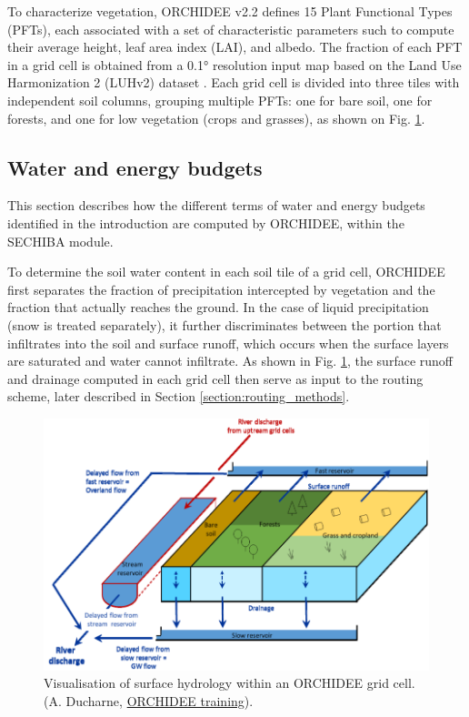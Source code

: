 To characterize vegetation, ORCHIDEE v2.2 defines 15 Plant Functional Types (PFTs), each associated with a set of characteristic parameters such to compute their average height, leaf area index (LAI), and albedo. The fraction of each PFT in a grid cell is obtained from a 0.1° resolution input map based on the Land Use Harmonization 2 (LUHv2) dataset \citep{hurtt_harmonization_2020, lurton_implementation_2020}. 
Each grid cell is divided into three tiles with independent soil columns, grouping multiple PFTs: one for bare soil, one for forests, and one for low vegetation (crops and grasses), as shown on Fig. \ref{fig:water_balance_AD}. 

\subsection{Water and energy budgets}

This section describes how the different terms of water and energy budgets identified in the introduction are computed by ORCHIDEE, within the SECHIBA module. 

To determine the soil water content in each soil tile of a grid cell, ORCHIDEE first separates the fraction of precipitation intercepted by vegetation and the fraction that actually reaches the ground. In the case of liquid precipitation (snow is treated separately), it further discriminates between the portion that infiltrates into the soil and surface runoff, which occurs when the surface layers are saturated and water cannot infiltrate. As shown in Fig. \ref{fig:water_balance_AD}, the surface runoff and drainage computed in each grid cell then serve as input to the routing scheme, later described in Section \ref{section:routing_methods}.

\begin{figure}[hbtp]
    \centering
    \includegraphics[width=0.8\linewidth]{images/methods/water_balance_AD.png}
    \caption{Visualisation of surface hydrology within an ORCHIDEE grid cell. (A. Ducharne, \href{https://forge.ipsl.fr/orchidee/attachment/wiki/GroupActivities/Training/cours_orchidee_feb2024_ducharne.pdf}{ORCHIDEE training}).}
    \label{fig:water_balance_AD}
\end{figure}

